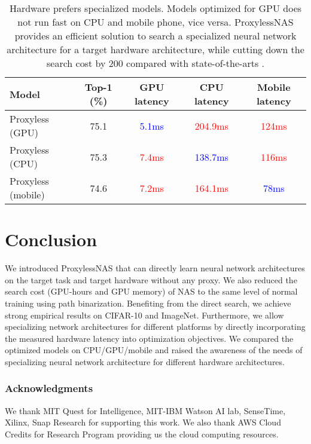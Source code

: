 \documentclass{article} \usepackage{iclr2019_conference,times}
\begin{document}
\begin{table}[t]
\centering
\begin{tabular}{l | c | c | c | c }
			\hline
			Model & Top-1 (\%) & GPU latency & CPU latency & Mobile latency \\
			\hline
			Proxyless (GPU)  & 75.1 & \textcolor{blue}{5.1ms} & \textcolor{red}{204.9ms} & \textcolor{red}{124ms} \\
			\hline
			Proxyless (CPU) & 75.3 & \textcolor{red}{7.4ms} & \textcolor{blue}{138.7ms} & \textcolor{red}{116ms} \\
			\hline
			Proxyless (mobile) & 74.6 & \textcolor{red}{7.2ms} & \textcolor{red}{164.1ms} & \textcolor{blue}{78ms} \\
			\hline
		\end{tabular}
\caption{Hardware prefers specialized models. Models optimized for GPU does not run fast on CPU and mobile phone, vice versa. ProxylessNAS provides an efficient solution to search a specialized neural network architecture for a target hardware architecture, while cutting down the search cost by 200 compared with state-of-the-arts \citep{zoph2016neural, tan2018mnasnet}. }\label{tab:imagenet_discussion}
\end{table}


 
\section{Conclusion}
We introduced ProxylessNAS that can directly learn neural network architectures on the target task and target hardware without any proxy. We also reduced the search cost (GPU-hours and GPU memory) of NAS to the same level of normal training using path binarization. Benefiting from the direct search, we achieve strong empirical results on CIFAR-10 and ImageNet. Furthermore, we allow specializing network architectures for different platforms by directly incorporating the measured hardware latency into optimization objectives. We compared the optimized models on CPU/GPU/mobile and raised the awareness of the needs of specializing neural network architecture for different hardware architectures. 
 
\subsubsection*{Acknowledgments}
We thank MIT Quest for Intelligence, MIT-IBM Watson AI lab, SenseTime, Xilinx, Snap Research for supporting this work. We also thank AWS Cloud Credits for Research Program providing us the cloud computing resources.
\end{document}
